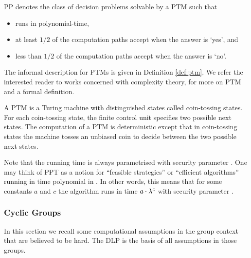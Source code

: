 \begin{definition}[\acl{PP}]\label{def:ppt}
\ac{PP} denotes the class of decision problems solvable by a \ac{PTM} \cA such that
\begin{itemize}
	\item \cA runs in polynomial-time,
	\item at least $1/2$ of the computation paths accept when the answer is `yes', and
	\item less than $1/2$ of the computation paths accept when the answer is `no'. \eod
\end{itemize}
\end{definition}

\noindent
The informal description for \aclp{PTM} is given in Definition \ref{def:ptm}.
We refer the interested reader to works concerned with complexity theory, \eg \cite{santos1969,WaterlooComplexity} for more on \ac{PTM} and a formal definition.

\begin{definition}\label{def:ptm}
A \ac{PTM} is a Turing machine with distinguished states called coin-tossing states.
For each coin-tossing state, the finite control unit specifies two possible next states.
The computation of a \ac{PTM} is deterministic except that in coin-tossing states the machine tosses an unbiased coin to decide between the two possible next states.
\eod
\end{definition}

\noindent
Note that the running time is always parametrised with security parameter \secpar.
One may think of \ac{PPT} as a notion for ``feasible strategies'' or ``efficient algorithms'' running in time polynomial in \secpar.
In other words, this means that for some constants $a$ and $c$ the algorithm runs in time $a\cdot \lambda^c$ with security parameter \secpar.

\subsubsection{Cyclic Groups}
In this section we recall some computational assumptions in the group context that are believed to be hard.
The \ac{DLP} is the basis of all assumptions in those groups.

